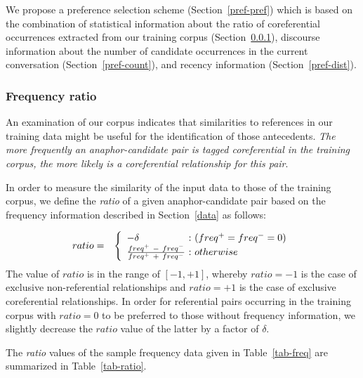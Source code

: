 We propose a preference selection scheme (Section~\ref{pref-pref}) which is based on the combination
of statistical information about the ratio of coreferential occurrences extracted from our training
corpus (Section~\ref{pref-freq}), discourse information about the number of candidate occurrences
in the current conversation (Section~\ref{pref-count}), and recency
information (Section~\ref{pref-dist}).

\subsubsection{Frequency ratio}
\label{pref-freq}

An examination of our corpus indicates that similarities to references in our training
data might be useful for the identification of those antecedents. {\em The more frequently
an anaphor-candidate pair is tagged coreferential in the training corpus, the more
likely is a coreferential relationship for this pair}.

In order to measure the similarity of the input data to those of the training corpus,
we define the {\em ratio} of a given anaphor-candidate pair based on the frequency
information described in Section~\ref{data} as follows:

\vspace*{-1em}
\setlength{\arraycolsep}{1pt}
\begin{eqnarray*}
  ratio & = & \left\{
                \begin{array}{l@{\ :\ }l}
                  -\delta & (freq^+ = freq^- = 0) \\
                  \frac{freq^+\ -\ freq^-}{freq^+\ +\ freq^-}
                         & otherwise
                \end{array}
              \right. \\[-0.5em]
\end{eqnarray*}

The value of $ratio$ is in the range of $[-1,+1]$, whereby $ratio=-1$ is the case of exclusive
non-referential relationships and $ratio=+1$ is the case of exclusive coreferential relationships.
In order for referential pairs occurring in the training corpus with $ratio=0$ to be preferred
to those without frequency information, we slightly decrease the $ratio$ value of the latter
by a factor of $\delta$.

The {\em ratio} values of the sample frequency data given in Table~\ref{tab-freq} are summarized in
Table~\ref{tab-ratio}.

